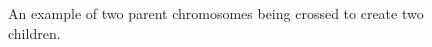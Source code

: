 \begin{figure}[h]
	\centering
	\caption{An example of two parent chromosomes being crossed to create two children.}
	\label{fig:geneticalgocrossover}
\end{figure}


